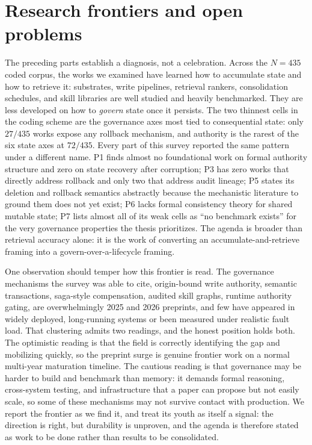 \section{Research frontiers and open problems}\label{sec:frontiers}


The preceding parts establish a diagnosis, not a celebration. Across the
$N{=}435$ coded corpus, the works we examined have learned how to accumulate state
and how to retrieve it: substrates, write pipelines, retrieval rankers,
consolidation schedules, and skill libraries are well studied and heavily benchmarked. They
are less developed on how to \emph{govern} state once it persists. The two thinnest
cells in the coding scheme are the governance axes most tied to consequential
state: only $27/435$ works expose any rollback mechanism, and authority is
the rarest of the six state axes at $72/435$. Every part of this survey reported
the same pattern under a different name. P1 finds almost no foundational work on formal
authority structure and zero on state recovery after corruption; P3 has zero works
that directly address rollback and only two that address audit lineage; P5 states
its deletion and rollback semantics abstractly because the mechanistic literature to
ground them does not yet exist; P6 lacks formal consistency theory for shared
mutable state; P7 lists almost all of its weak cells as ``no benchmark exists'' for
the very governance properties the thesis prioritizes. The agenda is broader than
 retrieval accuracy alone: it is the work of converting an
accumulate-and-retrieve framing into a govern-over-a-lifecycle framing.

One observation should temper how this frontier is read. The governance mechanisms
the survey was able to cite, origin-bound write authority, semantic transactions,
saga-style compensation, audited skill graphs, runtime authority gating, are
overwhelmingly 2025 and 2026 preprints, and few have appeared in widely deployed,
long-running systems or been measured under realistic fault load. That clustering
admits two readings, and the honest position holds both. The optimistic reading is
that the field is correctly identifying the gap and mobilizing quickly, so the
preprint surge is genuine frontier work on a normal multi-year maturation timeline.
 The cautious reading is that governance may be harder to build and benchmark than
memory: it demands formal reasoning, cross-system testing, and infrastructure that a
paper can propose but not easily scale, so some of these mechanisms may not survive
contact with production. We report the frontier as we find it, and treat its youth as
itself a signal: the direction is right, but durability is unproven, and the agenda
is therefore stated as work to be done rather than results to be consolidated.

